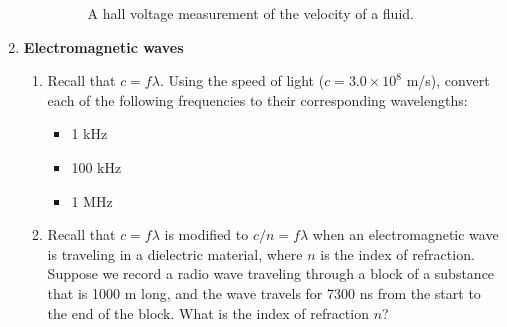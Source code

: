 \documentclass[10pt]{article}
\begin{document}
\begin{enumerate}
\begin{enumerate}
\begin{figure}[hb]
\caption{\label{fig:hall} A hall voltage measurement of the velocity of a fluid.}
\end{figure}
\end{enumerate}
\item \textbf{Electromagnetic waves}
\begin{enumerate}
\item Recall that $c = f\lambda$.  Using the speed of light ($c = 3.0 \times 10^8$ m/s), convert each of the following frequencies to their corresponding wavelengths:
\begin{itemize}
\item 1 kHz
\item 100 kHz
\item 1 MHz
\end{itemize}
\item Recall that $c = f\lambda$ is modified to $c/n = f\lambda$ when an electromagnetic wave is traveling in a dielectric material, where $n$ is the index of refraction.  Suppose we record a radio wave traveling through a block of a substance that is 1000 m long, and the wave travels for 7300 ns from the start to the end of the block.  What is the index of refraction $n$? \\ \vspace{2cm}
\end{enumerate}
\end{enumerate}
\end{document}
